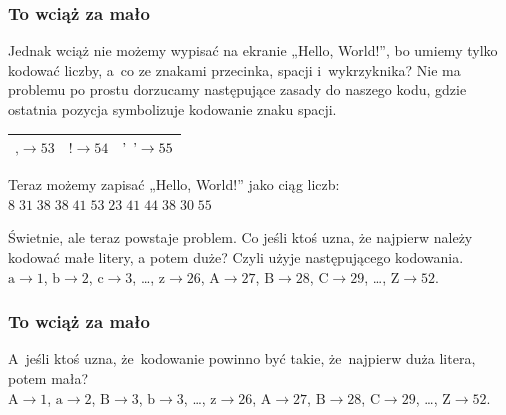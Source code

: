 \documentclass[10pt,t]{beamer}
\begin{document}
\begin{frame}
  \frametitle{To wciąż za mało}


  Jednak wciąż nie możemy wypisać na ekranie „Hello, World!”, bo umiemy
  tylko kodować liczby, a~co ze znakami przecinka, spacji i~wykrzyknika?
  Nie ma problemu po prostu dorzucamy następujące zasady do naszego kodu,
  gdzie ostatnia pozycja symbolizuje kodowanie znaku spacji.

  \begin{center}

    \begin{tabular}{| c | c | c |}
      \hline
      $\text{,} \to 53$ & $\text{!} \to 54$ & $\text{'\hphantom{a}'} \to 55$ \\
      \hline
    \end{tabular}

  \end{center}

  Teraz możemy zapisać „Hello, World!” jako ciąg liczb: \\
  $8 \; 31 \; 38 \; 38 \; 41 \; 53 \; 23 \; 41 \; 44 \; 38 \; 30 \; 55$

  Świetnie, ale teraz powstaje problem. Co jeśli ktoś uzna, że najpierw
  należy kodować małe litery, a potem duże? Czyli użyje następującego
  kodowania. \\
  $\text{a} \to 1$, $\text{b} \to 2$, $\text{c} \to 3$, \ldots, $\text{z} \to 26$,
  $\text{A} \to 27$, $\text{B} \to 28$, $\text{C} \to 29$, \ldots,
  $\text{Z} \to 52$.

\end{frame}







\begin{frame}
  \frametitle{To wciąż za mało}


  A~jeśli ktoś uzna, że~kodowanie powinno być takie, że~najpierw
  duża litera, potem mała? \\
  $\text{A} \to 1$, $\text{a} \to 2$, $\text{B} \to 3$, $\text{b} \to 3$, \ldots,
  $\text{z} \to 26$, $\text{A} \to 27$, $\text{B} \to 28$, $\text{C} \to 29$, \ldots,
  $\text{Z} \to 52$.

\end{frame}
\end{document}
